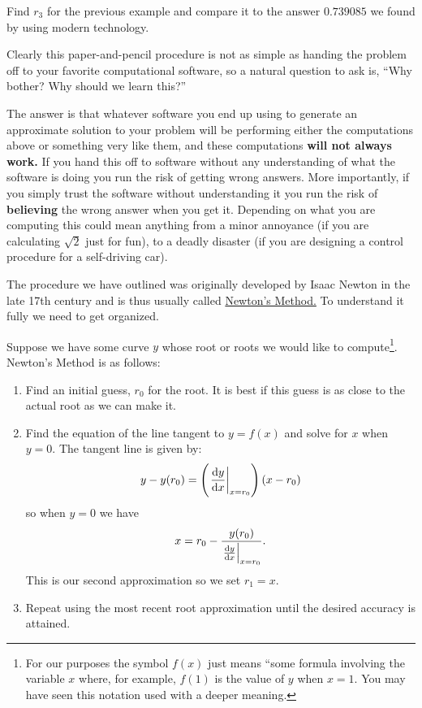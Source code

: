 \begin{embeddedproblem}{}
  Find $r_3$ for the previous example and compare it to the answer
  $0.739085$ we found by using modern technology.
\end{embeddedproblem}

Clearly this paper-and-pencil procedure is not as simple as handing
the problem off to your favorite computational software, so a natural
question to ask is, ``Why bother? Why should we learn this?''

The answer is that whatever software you end up using to generate an
approximate solution to your problem will be performing either the
computations above or something very like them, and these computations
{\bf will not always work.} If you hand this off to software without
any understanding of what the software is doing you run the risk of
getting wrong answers. More importantly, if you simply trust the
software without understanding it you run the risk of {\bf believing }
the wrong answer when you get it. Depending on what you are computing
this could mean anything from a minor annoyance (if you are
calculating $\sqrt{2}$ just for fun), to a deadly disaster (if you are
designing a control procedure for a self-driving car).

The procedure we have outlined was originally developed by Isaac
Newton in the late 17th century and is thus usually called
\underline{Newton's Method.} To understand it fully we need to get
organized.

Suppose we have some curve $y$ whose root or roots we would like
to compute\footnote{For our purposes the symbol $f(x)$ just means
  ``some formula involving the variable $x$ where, for example, $f(1)$
  is the value of $y$ when $x=1.$ You may have seen this notation used
  with a deeper meaning.}. Newton's Method is as follows:
\begin{enumerate}
\item Find an initial guess, $r_0$ for the root. It is best if this
  guess is as close to the actual root as we can make it.
\item Find the equation of the line tangent to $y=f(x)$ and solve for
  $x$ when $y=0.$ The tangent line is given by:
$$
y-y(r_0) = \left(\left.\frac{\text{d}{y}}{\text{d}{x}}\right|_{x=r_0}\right)(x-r_0)
$$
so when $y=0$ we have
$$
x=r_0-\frac{y(r_0)}{\left.\frac{\text{d}{y}}{\text{d}{x}}\right|_{x=r_0}}.
$$
This is our second approximation so we set $r_1=x.$
\item Repeat using the most recent root approximation until the
  desired accuracy is attained. 
\end{enumerate}

